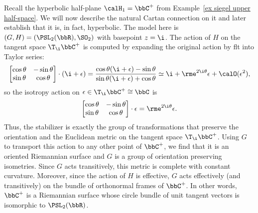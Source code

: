 \begin{example}
    Recall the hyperbolic half-plane $\calH_1=\bbC^+$ from Example~\ref{ex siegel upper half-space}. We will now describe the natural Cartan connection on it and later establish that it is, in fact, hyperbolic. The model here is $(G,H)=(\PSL_2(\bbR),\SO_2)$ with basepoint $z=\i$. The action of $H$ on the tangent space $\T_\i \bbC^+$ is computed by expanding the original action by \gls{flt} into Taylor series:
    \begin{align}
        \begin{bmatrix}
            \cos\theta & -\sin\theta\\
            \sin\theta & \cos\theta
        \end{bmatrix}\cdot (\i +\epsilon)=
        \frac{\cos\theta(\i +\epsilon)-\sin\theta}{\sin\theta(\i +\epsilon)+\cos\theta}\simeq \i +\rme^{2\i\theta}\epsilon+\calO(\epsilon^2),
    \end{align}
    so the isotropy action on $\epsilon\in \T_\i \bbC^+\cong \bbC$ is 
    \[\begin{bmatrix}
        \cos\theta & -\sin\theta\\
        \sin\theta & \cos\theta
    \end{bmatrix}\cdot \epsilon = \rme^{2\i\theta}\epsilon.\]
    Thus, the stabilizer is exactly the group of transformations that preserve the orientation and the Euclidean metric on the tangent space $\T_\i \bbC^+$. Using $G$ to transport this action to any other point of $\bbC^+$, we find that it is an oriented Riemannian surface and $G$ is a group of orientation preserving isometries. Since $G$ acts transitively, this metric is complete with constant curvature. Moreover, since the action of $H$ is effective, $G$ acts effectively (and transitively) on the bundle of orthonormal frames of $\bbC^+$. In other words, $\bbC^+$ is a Riemannian surface whose circle bundle of unit tangent vectors is isomorphic to $\PSL_2(\bbR)$.  


\end{example}
